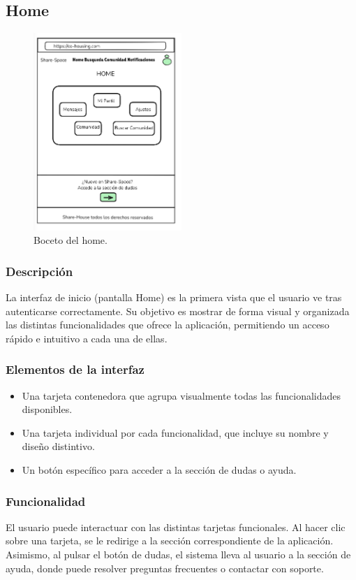 \subsection{Home}
\begin{figure}[H]
    \centering
    \includegraphics[width=0.5\textwidth]{fotos/Home-boceto.png}
    \caption{Boceto del home.}
    \label{fig:home}
\end{figure}
\subsubsection{Descripción}
La interfaz de inicio (pantalla Home) es la primera vista que el usuario ve tras autenticarse correctamente. Su objetivo es mostrar de forma visual y organizada las distintas funcionalidades que ofrece la aplicación, permitiendo un acceso rápido e intuitivo a cada una de ellas.

\subsubsection{Elementos de la interfaz}
\begin{itemize}
  \item Una tarjeta contenedora que agrupa visualmente todas las funcionalidades disponibles.
  \item Una tarjeta individual por cada funcionalidad, que incluye su nombre y diseño distintivo.
  \item Un botón específico para acceder a la sección de dudas o ayuda.
\end{itemize}

\subsubsection{Funcionalidad}
El usuario puede interactuar con las distintas tarjetas funcionales. Al hacer clic sobre una tarjeta, se le redirige a la sección correspondiente de la aplicación. Asimismo, al pulsar el botón de dudas, el sistema lleva al usuario a la sección de ayuda, donde puede resolver preguntas frecuentes o contactar con soporte.

